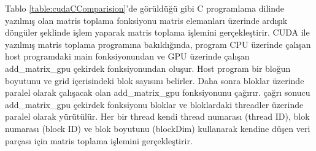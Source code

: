 Tablo \ref{table:cudaCComparision}’de görüldüğü gibi C programlama dilinde yazılmış olan matris toplama fonksiyonu matris elemanları üzerinde ardışık döngüler şeklinde işlem yaparak matris toplama işlemini gerçekleştirir. CUDA ile yazılmış matris toplama programına bakıldığında, program CPU üzerinde çalışan host programdaki main fonksiyonundan ve GPU üzerinde çalışan add_matrix_gpu çekirdek fonksiyonundan oluşur. Host program bir bloğun boyutunu ve grid içerisindeki blok sayısını belirler. Daha sonra bloklar üzerinde paralel olarak çalışacak olan add_matrix_gpu fonksiyonunu çağırır. çağrı sonucu add_matrix_gpu çekirdek fonksiyonu bloklar ve bloklardaki threadler üzerinde paralel olarak yürütülür. Her bir thread kendi thread numarası (thread ID), blok numarası (block ID) ve blok boyutunu (blockDim) kullanarak kendine düşen veri parçası için matris toplama işlemini gerçekleştirir. \par


